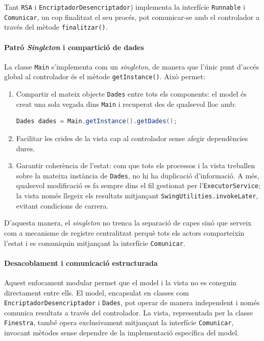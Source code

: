 \documentclass{ieeetj}
\begin{document}
Tant \texttt{RSA} i \texttt{EncriptadorDesencriptador}) implementa la interfície \texttt{Runnable} i \texttt{Comunicar}, un cop finalitzat el seu procés, pot comunicar-se amb el controlador a través del mètode \texttt{finalitzar()}.

\paragraph{Patró \emph{Singleton} i compartició de dades}

La classe \texttt{Main} s’implementa com un \emph{singleton}, de manera que
l’únic punt d’accés global al controlador és el mètode
\texttt{getInstance()}.  
Això permet:

\begin{enumerate}
  \item Compartir el mateix objecte \texttt{Dades} entre tots els components:
        el model és creat una sola vegada dins \texttt{Main} i recuperat des
        de qualsevol lloc amb:
\begin{lstlisting}[language=Java]
Dades dades = Main.getInstance().getDades();
\end{lstlisting}

  \item Facilitar les crides de la vista cap al controlador sense afegir
        dependències dures. 

  \item Garantir coherència de l’estat: com que tots els processos i la
        vista treballen sobre la mateixa instància de \texttt{Dades}, no hi ha
        duplicació d’informació.  A més, qualsevol modificació es fa sempre
        dins el fil gestionat per l’\texttt{ExecutorService}; la vista només
        llegeix els resultats mitjançant \texttt{SwingUtilities.invokeLater},
        evitant condicions de carrera.
\end{enumerate}

D’aquesta manera, el \emph{singleton} no trenca la separació de capes sinó que
serveix com a mecanisme de registre centralitzat perquè tots els actors
 comparteixin l’estat i es comuniquin mitjançant la
interfície \texttt{Comunicar}.


\paragraph{Desacoblament i comunicació estructurada}

Aquest enfocament modular permet que el model i la vista no es coneguin directament entre ells. El model, encapsulat en classes com \texttt{EncriptadorDesencriptador} i \texttt{Dades}, pot operar de manera independent i només comunica resultats a través del controlador. \newline
La vista, representada per la classe \texttt{Finestra}, també opera exclusivament mitjançant la interfície \texttt{Comunicar}, invocant mètodes sense dependre de la implementació específica del model.\newline
\end{document}
